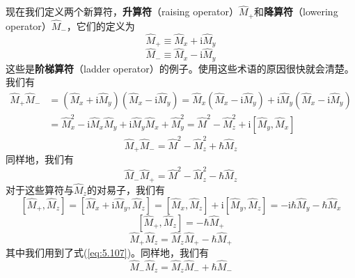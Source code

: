     现在我们定义两个新算符，\textbf{升算符}（raising operator）$\hat{M}_+$和\textbf{降算符}（lowering operator）$\hat{M}_-$，它们的定义为
    \begin{equation}
        \hat{M}_+ \equiv \hat{M}_x + \mathrm{i}\hat{M}_y
        \label{eq:5.110}
    \end{equation}
    \begin{equation}
        \hat{M}_- \equiv \hat{M}_x - \mathrm{i}\hat{M}_y
        \label{eq:5.111}
    \end{equation}
    这些是\textbf{阶梯算符}（ladder operator）的例子。使用这些术语的原因很快就会清楚。我们有
    \begin{equation*}
        \begin{aligned}
            \hat{M}_+\hat{M}_- & = \left(\hat{M}_x+\mathrm{i}\hat{M}_y\right)\left(\hat{M}_x-\mathrm{i}\hat{M}_y\right) = \hat{M}_x\left(\hat{M}_x-\mathrm{i}\hat{M}_y\right) + \mathrm{i}\hat{M}_y\left(\hat{M}_x-\mathrm{i}\hat{M}_y\right) \\
            & = \hat{M}_x^2 - \mathrm{i}\hat{M}_x\hat{M}_y + \mathrm{i}\hat{M}_y\hat{M}_x + \hat{M}_y^2 = \hat{M}^2 - \hat{M}_z^2 + \mathrm{i}\left[\hat{M}_y,\hat{M}_x\right]
        \end{aligned}
    \end{equation*}
    \begin{equation}
        \hat{M}_+\hat{M}_- = \hat{M}^2 - \hat{M}_z^2 + \hbar\hat{M}_z
        \label{eq:5.112}
    \end{equation}
    同样地，我们有
    \begin{equation}
        \hat{M}_-\hat{M}_+ = \hat{M}^2 - \hat{M}_z^2 - \hbar\hat{M}_z
        \label{eq:5.113}
    \end{equation}
    对于这些算符与$\hat{M}_z$的对易子，我们有
    \begin{equation*}
        \left[\hat{M}_+,\hat{M}_z\right] = \left[\hat{M}_x+\mathrm{i}\hat{M}_y,\hat{M}_z\right] = \left[\hat{M}_x,\hat{M}_z\right]+\mathrm{i}\left[\hat{M}_y,\hat{M}_z\right] = -\mathrm{i}\hbar\hat{M}_y - \hbar\hat{M}_x
    \end{equation*}
    \begin{equation*}
        \left[\hat{M}_+,\hat{M}_z\right] = -\hbar\hat{M}_+
    \end{equation*}
    \begin{equation}
        \hat{M}_+\hat{M}_z = \hat{M}_z\hat{M}_+ - \hbar\hat{M}_+
        \label{eq:5.114}
    \end{equation}
    其中我们用到了式(\ref{eq:5.107})。同样地，我们有
    \begin{equation}
        \hat{M}_-\hat{M}_z = \hat{M}_z\hat{M}_- + \hbar\hat{M}_-
        \label{eq:5.115}
    \end{equation}

